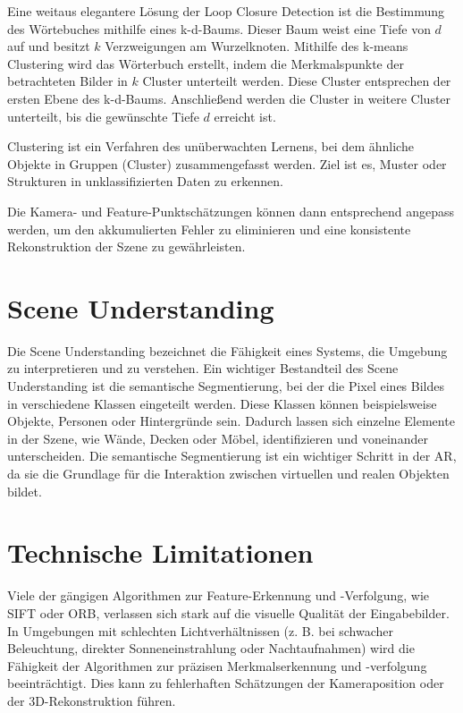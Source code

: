 Eine weitaus elegantere Lösung der Loop Closure Detection ist die Bestimmung des Wörtebuches mithilfe eines k-d-Baums. Dieser Baum weist eine Tiefe von \( d \) auf und besitzt \( k \) Verzweigungen am Wurzelknoten. Mithilfe des k-means Clustering wird das Wörterbuch erstellt, indem die Merkmalspunkte der betrachteten Bilder in \( k \) Cluster unterteilt werden. Diese Cluster entsprechen der ersten Ebene des k-d-Baums. Anschließend werden die Cluster in weitere Cluster unterteilt, bis die gewünschte Tiefe \( d \) erreicht ist.


\begin{tcolorbox}[colback=THAi-Blue!20!white, colframe=THAi-Blue]
    Clustering ist ein Verfahren des unüberwachten Lernens, bei dem ähnliche Objekte in Gruppen (Cluster) zusammengefasst werden. Ziel ist es, Muster oder Strukturen in unklassifizierten Daten zu erkennen. 
\end{tcolorbox}




Die Kamera- und Feature-Punktschätzungen können dann entsprechend angepass werden, um den akkumulierten Fehler zu eliminieren und eine konsistente Rekonstruktion der Szene zu gewährleisten.



\section{Scene Understanding}

Die Scene Understanding bezeichnet die Fähigkeit eines Systems, die Umgebung zu interpretieren und zu verstehen. Ein wichtiger Bestandteil des Scene Understanding ist die semantische Segmentierung, bei der die Pixel eines Bildes in verschiedene Klassen eingeteilt werden. Diese Klassen können beispielsweise Objekte, Personen oder Hintergründe sein. Dadurch lassen sich einzelne Elemente in der Szene, wie Wände, Decken oder Möbel, identifizieren und voneinander unterscheiden. Die semantische Segmentierung ist ein wichtiger Schritt in der AR, da sie die Grundlage für die Interaktion zwischen virtuellen und realen Objekten bildet.



\section{Technische Limitationen}

Viele der gängigen Algorithmen zur Feature-Erkennung und -Verfolgung, wie SIFT oder ORB, verlassen sich stark auf die visuelle Qualität der Eingabebilder. In Umgebungen mit schlechten Lichtverhältnissen (z. B. bei schwacher Beleuchtung, direkter Sonneneinstrahlung oder Nachtaufnahmen) wird die Fähigkeit der Algorithmen zur präzisen Merkmalserkennung und -verfolgung beeinträchtigt. Dies kann zu fehlerhaften Schätzungen der Kameraposition oder der 3D-Rekonstruktion führen.

